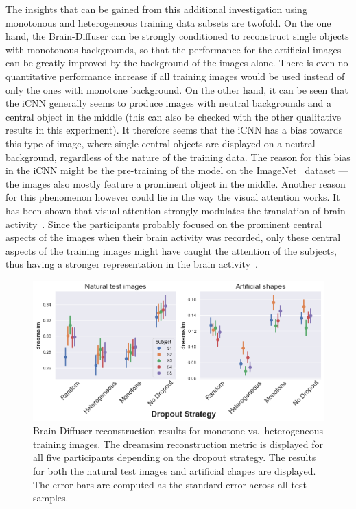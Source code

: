 The insights that can be gained from this additional investigation using monotonous and heterogeneous training data subsets are twofold. On the one hand, the Brain-Diffuser can be strongly conditioned to reconstruct single objects with monotonous backgrounds, so that the performance for the artificial images can be greatly improved by the background of the images alone. There is even no quantitative performance increase if all training images would be used instead of only the ones with monotone background. On the other hand, it can be seen that the iCNN generally seems to produce images with neutral backgrounds and a central object in the middle (this can also be checked with the other qualitative results in this experiment). It therefore seems that the iCNN has a bias towards this type of image, where single central objects are displayed on a neutral background, regardless of the nature of the training data. The reason for this bias in the iCNN might be the pre-training of the model on the ImageNet~\cite{dengImageNetLargescaleHierarchical2009} dataset --- the images also mostly feature a prominent object in the middle. Another reason for this phenomenon however could lie in the way the visual attention works. It has been shown that visual attention strongly modulates the translation of brain-activity~\cite{horikawaAttentionModulatesNeural2022}. Since the participants probably focused on the prominent central aspects of the images when their brain activity was recorded, only these central aspects of the training images might have caught the attention of the subjects, thus having a stronger representation in the brain activity~\cite{wolfeVisualAttention2000}. 

\begin{figure}[ht]
  \centering
  \includegraphics[width=1\textwidth]{plots/dropout_discussion_reconstruction_bd.png}
  \caption[Brain-Diffuser reconstruction performance monotone vs.\ heterogeneous training sample]{Brain-Diffuser reconstruction results for monotone vs.\ heterogeneous training images. The dreamsim reconstruction metric is displayed for all five participants depending on the dropout strategy. The results for both the natural test images and artificial chapes are displayed. The error bars are computed as the standard error across all test samples.}\label{fig:dropout_discussion_reconstruction_bd}
\end{figure}

